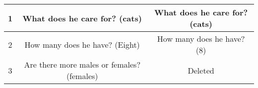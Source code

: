 \documentclass[11pt,a4paper]{article}
\begin{document}
\begin{table*}[t!]
\begin{tabular}{|c|c|c|}
		1                                                                                                                                                                                                                                           & What does he care for?  (cats)                                                                                                                                                                                                                                                                                                                    & What does he care for?  (cats)                                                                                                                                                                                                                                                                                                                \\ \hline
		2                                                                                                                                                                                                                                           & How many does he have? (Eight)                                                                                                                                                                                                                                                                                                                    & How many does he have? (8)                                                                                                                                                                                                                                                                                                                    \\ \hline
		3                                                                                                                                                                                                                                           & Are there more males or females? (females)                                                                                                                                                                                                                                                                                                        & Deleted                                                                                                                                                                                                                                                                                                                                       \\ \hline

\end{tabular}
\end{table*}
\end{document}
